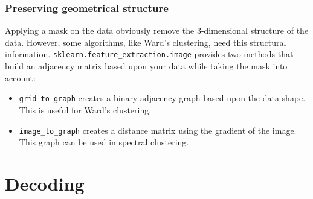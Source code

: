 \documentclass{frontiersSCNS} %
\begin{document}
\subsubsection{Preserving geometrical structure}

Applying a mask on the data obviously remove the 3-dimensional structure of the
data. However, some algorithms, like Ward's clustering, need this structural
information.
\verb!sklearn.feature_extraction.image! provides two methods that build an
adjacency matrix based upon your data while taking the mask into account:
\begin{itemize}
    \item \verb!grid_to_graph! creates a binary adjacency graph based upon the
        data shape. This is useful for Ward's clustering.
    \item \verb!image_to_graph! creates a distance matrix using the gradient of
        the image. This graph can be used in spectral clustering.
\end{itemize}





\section{Decoding}
\end{document}

